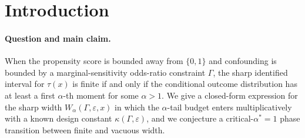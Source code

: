 \documentclass[11pt]{article}
\theoremstyle{definition}
\theoremstyle{plain}
\theoremstyle{remark}
\begin{document}
\begin{abstract}
We study sharp partial identification of the conditional average treatment effect $\tau(x)$ under strict propensity overlap $e(x)\in[\varepsilon,1-\varepsilon]$, a marginal-sensitivity model $\mathrm{MSM}(\Gamma)$ on the odds-ratio of the unobserved full-data propensity, and a one-sided $\alpha$-th-moment envelope on the conditional outcome distribution. The flagship kernel is a closed-form, $\alpha$-indexed sharp width
$W_\alpha(\Gamma,\varepsilon,x) := \overline{\tau}_\alpha(x;\Gamma,\varepsilon) - \underline{\tau}_\alpha(x;\Gamma,\varepsilon) = \kappa(\Gamma,\varepsilon)\,M_\alpha(x)$
in which $\kappa$ is a known scalar of the design and $M_\alpha(x)$ is the conditional $\alpha$-tail budget computed from $\sigma_\alpha(x,\cdot)$ and the observed conditional quantiles. We conjecture that this width is sharp, strictly tighter than support-only bounds, and exhibits a sharp phase transition: $W_\alpha < \infty$ iff $\alpha > 1$, and $W_\alpha = \infty$ for every $\Gamma > 1$ when $\alpha = 1$. A second-order conjecture promotes the conditional-tail extremal coupling to a plug-in estimator with rate $\min(n^{-1/2}, n^{-(\alpha-1)/\alpha})$, exposing a rate phase transition at $\alpha = 2$ that contracts to the parametric rate of \citet*{YadlowskyNamkoongBasuDuchiTian2022} once a second moment is available. The kernel is the first $\alpha$-indexed sharp CATE width formula in the marginal-sensitivity literature and would close the heavy-tail vacuity flag of \citet*{AsiaeePalBeckHuling2026SharpGeneralization}.
\end{abstract}

\section{Introduction}

\paragraph{Question and main claim.} When the propensity score is bounded away from $\{0,1\}$ and confounding is bounded by a marginal-sensitivity odds-ratio constraint $\Gamma$, the sharp identified interval for $\tau(x)$ is finite if and only if the conditional outcome distribution has at least a first $\alpha$-th moment for some $\alpha > 1$. We give a closed-form expression for the sharp width $W_\alpha(\Gamma,\varepsilon,x)$ in which the $\alpha$-tail budget enters multiplicatively with a known design constant $\kappa(\Gamma,\varepsilon)$, and we conjecture a critical-$\alpha^* = 1$ phase transition between finite and vacuous width.
\end{document}

